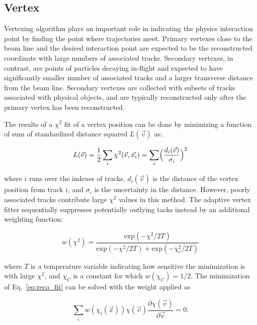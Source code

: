 \subsection{Vertex}
Vertexing algorithm plays an important role in indicating the physics interaction point by finding the point where trajectories meet.
Primary vertexes close to the beam line and the desired interaction point are expected to be the reconstructed coordinate with large numbers of associated tracks.
Secondary vertexes, in contrast, are points of particles decaying in-flight and expected to have significantly smaller number of associated tracks and a larger transverse distance from the beam line.
Secondary vertexes are collected with subsets of tracks associated with physical objects, and are typically reconstructed only after the primary vertex has been reconstructed.

The results of a $\chi^2$ fit of a vertex position can be done by minimizing a function of sum of standardized distance squared $L(\vec{v})$ as:
\begin{linenomath}\begin{equation}\label{eq:reco_fit}
    L(\vec{v}) = \frac{1}{2} \sum_i \chi^2(\vec{v}, \vec{x_i}) = \sum_i \Bigl( \frac{d_i(\vec{v})}{\sigma_i} \Bigr)^2
\end{equation}\end{linenomath}
where $i$ runs over the indexes of tracks, $d_i(\vec{v})$ is the distance of the vertex position from track $i$, and $\sigma_i$ is the uncertainty in the distance.
However, poorly associated tracks contribute large $\chi^2$ values in this method.
The adaptive vertex fitter sequentially suppresses potentially outlying tacks instead by an additional weighting function:
\begin{linenomath}\begin{equation}\label{eq:reco_weight}
    w(\chi^2) = \frac{\mathrm{exp}(-\chi^2/2T)}{\mathrm{exp}(-\chi^2/2T)+\mathrm{exp}(-\chi^2_c/2T)}
\end{equation}\end{linenomath}
where $T$ is a temperature variable indicating how sensitive the minimization is with large $\chi^2$, and $\chi_C$ is a constant for which $w(\chi_C)=1/2$.
The minimization of Eq.~\ref{eq:reco_fit} can be solved with the weight applied as 
\begin{linenomath}\begin{equation}\label{eq:reco_temp}
    \sum_i w(\chi_i(\vec{x}))\chi(\vec{v})\frac{\partial\chi(\vec{v})}{\partial\vec{v}} = 0.
\end{equation}\end{linenomath}

